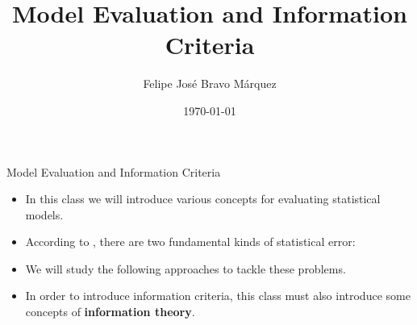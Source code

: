 \documentclass[handout]{beamer}
\title{Model Evaluation and Information Criteria}
\author[Felipe Bravo Márquez]{\footnotesize
 \textcolor[rgb]{0.00,0.00,1.00}{Felipe José Bravo Márquez}}
\date{ \today }
\begin{document}
\begin{frame}
\titlepage


\end{frame}




\begin{frame}{Model Evaluation and Information Criteria}
\scriptsize{
\begin{itemize}
\item In this class we will introduce various concepts for evaluating statistical models.

\item According to \cite{mcelreath2020statistical}, there are two fundamental kinds of statistical error:


\item We will study the following approaches to tackle these problems.



\item In order to introduce information criteria, this class must also introduce some concepts of \textbf{information theory}.

 
\end{itemize}



} 

\end{frame}
\end{document}
